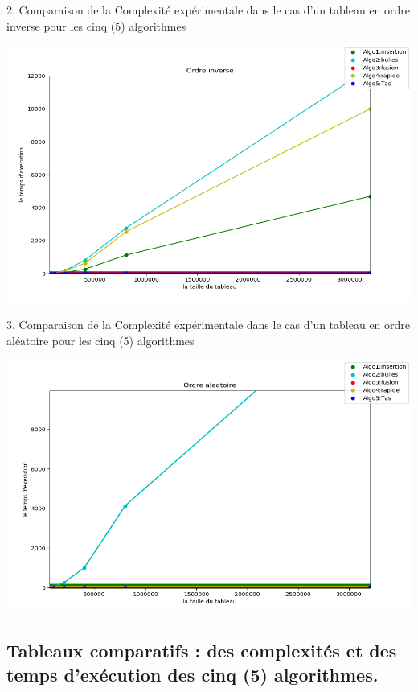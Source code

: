 \documentclass[12pt]{article}
\begin{document}
2. Comparaison de la Complexité expérimentale dans le cas d'un tableau en ordre inverse pour les cinq (5) algorithmes
	
		\includegraphics[width=1\textwidth]{graph/ordre_inverse.png}
	
3. Comparaison de la Complexité expérimentale dans le cas d'un tableau en ordre aléatoire pour les cinq (5) algorithmes
		
		\includegraphics[width=1\textwidth]{graph/ordre_aleatoire.png}
		


\subsection{Tableaux comparatifs : des complexités et des temps d'exécution des cinq (5) algorithmes.}
\end{document}
